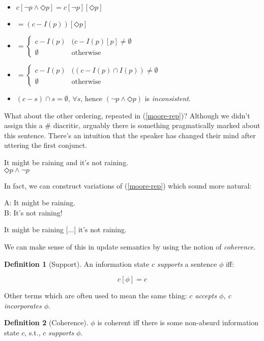 \documentclass[nols,twoside,nofonts,nobib,nohyper]{tufte-handout}
\theoremstyle{definition}
\newtheorem{definition}{Definition}[section]
\begin{document}
\begin{itemize}

    \item $c[¬ p ∧ ◇ p] = c[¬ p][◇ p]$
    \item $= (c - I(p))[◇ p]$
  \item $= \begin{cases}
    c - I(p)&(c - I(p)[p] ≠ ∅\\
    ∅&\text{otherwise}
    \end{cases}$
  \item $= \begin{cases}
    c - I(p)&((c - I(p) ∩ I(p)) ≠ ∅\\
    ∅&\text{otherwise}
    \end{cases}$
  \item $(c - s) ∩ s = ∅$, $∀s$, hence $(¬ p ∧ ◇ p)$ is \textit{inconsistent}.
\end{itemize}

What about the other ordering, repeated in (\ref{moore-rep})? Although we didn't assign this a $\#$ diacritic, arguably there is something pragmatically marked about this sentence. There's an intuition that the speaker has changed their mind after uttering the first conjunct.

\ex
{}It might be raining and it's not raining.\\
$◇ p ∧ ¬ p$\label{moore-rep}
\xe

In fact, we can construct variations of (\ref{moore-rep}) which sound more natural:

\ex
A: It might be raining.\\
B: It's not raining!
\xe

\ex
It might be raining [...] it's not raining.
\xe

We can make sense of this in update semantics by using the notion of \textit{coherence}.

\begin{definition}[Support]
  An information state $c$ \textit{supports} a sentence $ϕ$ iff:

  $$c[ϕ] = c$$

  Other terms which are often used to mean the same thing: \textit{$c$ accepts $\phi$, $c$ incorporates $\phi$}.
\end{definition}

\begin{definition}[Coherence]
$ϕ$ is coherent iff there is some non-absurd information state $c$, s.t., $c$ \textit{supports} $ϕ$.
\end{definition}
\end{document}
